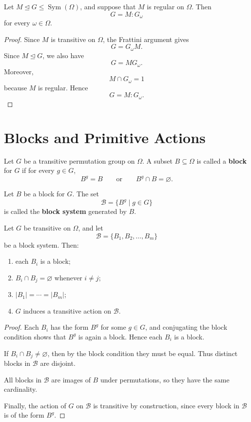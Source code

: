 \begin{lemma}
Let \(M\unlhd G\leq \operatorname{Sym}(\Omega)\), and suppose that \(M\) is
regular on \(\Omega\). Then
\[
    G=M:G_\omega
\]
for every \(\omega\in\Omega\).
\end{lemma}

\begin{proof}
Since \(M\) is transitive on \(\Omega\), the Frattini argument gives
\[
    G=G_\omega M.
\]
Since \(M\unlhd G\), we also have
\[
    G=MG_\omega.
\]
Moreover,
\[
    M\cap G_\omega=1
\]
because \(M\) is regular. Hence
\[
    G=M:G_\omega.
\]
\end{proof}

\section{Blocks and Primitive Actions}

\begin{definition}[Block]
Let \(G\) be a transitive permutation group on \(\Omega\). A subset
\(B\subseteq \Omega\) is called a \textbf{block} for \(G\) if for every
\(g\in G\),
\[
    B^g=B
    \qquad
    \text{or}
    \qquad
    B^g\cap B=\varnothing.
\]
\end{definition}

\begin{definition}
Let \(B\) be a block for \(G\). The set
\[
    \mathcal B=\{B^g\mid g\in G\}
\]
is called the \textbf{block system} generated by \(B\).
\end{definition}

\begin{proposition}
Let \(G\) be transitive on \(\Omega\), and let
\[
    \mathcal B=\{B_1,B_2,\dots,B_m\}
\]
be a block system. Then:
\begin{enumerate}[label=(\arabic*)]
    \item each \(B_i\) is a block;
    \item \(B_i\cap B_j=\varnothing\) whenever \(i\neq j\);
    \item \(|B_1|=\cdots=|B_m|\);
    \item \(G\) induces a transitive action on \(\mathcal B\).
\end{enumerate}
\end{proposition}

\begin{proof}
Each \(B_i\) has the form \(B^g\) for some \(g\in G\), and conjugating the block
condition shows that \(B^g\) is again a block. Hence each \(B_i\) is a block.

If \(B_i\cap B_j\neq\varnothing\), then by the block condition they must be equal.
Thus distinct blocks in \(\mathcal B\) are disjoint.

All blocks in \(\mathcal B\) are images of \(B\) under permutations, so they have the
same cardinality.

Finally, the action of \(G\) on \(\mathcal B\) is transitive by construction, since every
block in \(\mathcal B\) is of the form \(B^g\).
\end{proof}

